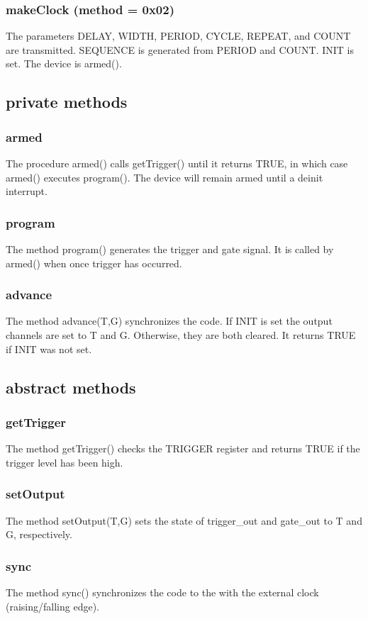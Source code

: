\documentclass{article}
\begin{document}
\subsubsection*{makeClock (method = 0x02)}
The parameters DELAY, WIDTH, PERIOD, CYCLE, REPEAT, and COUNT are transmitted. SEQUENCE is generated from PERIOD and COUNT. INIT is set. The device is armed().
\subsection*{private methods}
\subsubsection*{armed}
The procedure armed() calls getTrigger() until it returns TRUE, in which case armed() executes program(). The device will remain armed until a deinit interrupt.
\subsubsection*{program}
The method program() generates the trigger and gate signal. It is called by armed() when once trigger has occurred.
\subsubsection*{advance}
The method advance(T,G) synchronizes the code. If INIT is set the output channels are set to T and G. Otherwise, they are both cleared. It returns TRUE if INIT was not set.
\subsection*{abstract methods}
\subsubsection*{getTrigger}
The method getTrigger() checks the TRIGGER register and returns TRUE if the trigger level has been high.
\subsubsection*{setOutput}
The method setOutput(T,G) sets the state of trigger\_out and gate\_out to T and G, respectively.
\subsubsection*{sync}
The method sync() synchronizes the code to the with the external clock (raising/falling edge).
\end{document}
